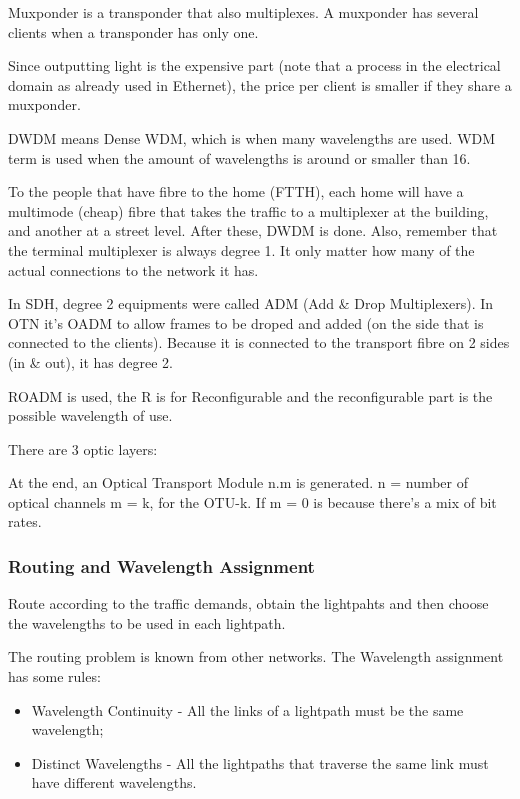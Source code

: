 Muxponder is a transponder that also multiplexes. A muxponder has several clients when a transponder has only one. 

Since outputting light is the expensive part (note that a process in the electrical domain as already used in Ethernet), the price per client is smaller if they share a muxponder.


DWDM means Dense WDM, which is when many wavelengths are used. WDM term is used when the amount of wavelengths is around or smaller than 16.

To the people that have fibre to the home (FTTH), each home will have a multimode (cheap) fibre that takes the traffic to a multiplexer at the building, and another at a street level. After these, DWDM is done. Also, remember that the terminal multiplexer is always degree 1. It only matter how many of the actual connections to the network it has.


In SDH, degree 2 equipments were called ADM (Add \& Drop Multiplexers). In OTN it's OADM to allow frames to be droped and added (on the side that is connected to the clients). Because it is connected to the transport fibre on 2 sides (in \& out), it has degree 2.

ROADM is used, the R is for Reconfigurable and the reconfigurable part is the possible wavelength of use.


There are 3 optic layers:


At the end, an Optical Transport Module n.m is generated. n = number of optical channels m = k, for the OTU-k. If m = 0 is because there's a mix of bit rates.






\subsubsection{Routing and Wavelength Assignment}
Route according to the traffic demands, obtain the lightpahts and then choose the wavelengths to be used in each lightpath.


The routing problem is known from other networks. The Wavelength assignment has some rules:
\begin{itemize}
    \item Wavelength Continuity - All the links of a lightpath must be the same wavelength;
    \item Distinct Wavelengths - All the lightpaths that traverse the same link must have different wavelengths.
\end{itemize}

